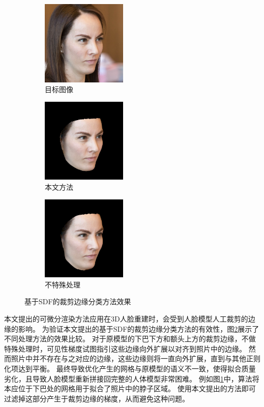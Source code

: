 \begin{figure}
    \centering
    \begin{subfigure}{1.6in}
        \includegraphics[height=1.6in]{figures/diffrast_face/04114/target_hs}%
        \caption{目标图像}
    \end{subfigure}%
    \begin{subfigure}{1.6in}
        \includegraphics[height=1.6in]{figures/diffrast_face/04114/final_rerendered}%
        \caption{本文方法}
    \end{subfigure}%
    \begin{subfigure}{1.6in}
        \includegraphics[height=1.6in]{figures/diffrast_face/04114/no_sdf}%
        \caption{不特殊处理}
        \label{fig:edge_gradient_no_sdf}
\end{subfigure}%
    \caption{基于SDF的裁剪边缘分类方法效果}
    \label{fig:edge_gradient}
\end{figure}
本文提出的可微分渲染方法应用在3D人脸重建时，会受到人脸模型人工裁剪的边缘的影响。
为验证本文提出的基于SDF的裁剪边缘分类方法的有效性，图\ref{fig:edge_gradient}展示了不同处理方法的效果比较。
对于原模型的下巴下方和额头上方的裁剪边缘，不做特殊处理时，可见性梯度试图指引这些边缘向外扩展以对齐到照片中的边缘。
然而照片中并不存在与之对应的边缘，这些边缘则将一直向外扩展，直到与其他正则化项达到平衡。
最终导致优化产生的网格与原模型的语义不一致，使得拟合质量劣化，且导致人脸模型重新拼接回完整的人体模型非常困难。
例如图\ref{fig:edge_gradient_no_sdf}中，算法将本应位于下巴处的网格用于拟合了照片中的脖子区域。
使用本文提出的方法即可过滤掉这部分产生于裁剪边缘的梯度，从而避免这种问题。

